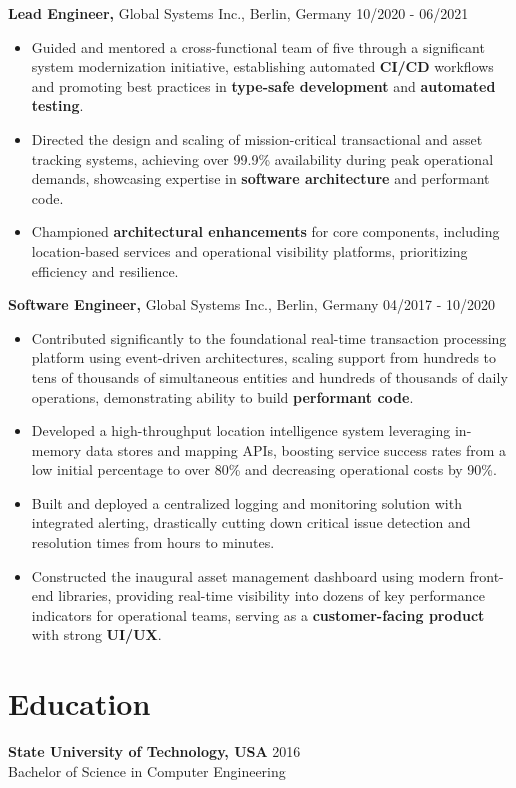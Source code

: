 \documentclass[10pt]{article}
\newcommand{\rightaligned}[1]{\hfill #1}
\begin{document}
\vspace{1mm}
\textbf{Lead Engineer,} Global Systems Inc., Berlin, Germany              \rightaligned{10/2020 - 06/2021}
\begin{itemize}
    \item Guided and mentored a cross-functional team of five through a significant system modernization
      initiative, establishing automated \textbf{CI/CD} workflows and promoting best practices in \textbf{type-safe
      development} and \textbf{automated testing}.
    \item Directed the design and scaling of mission-critical transactional and asset tracking systems,
      achieving over 99.9\% availability during peak operational demands, showcasing expertise in
      \textbf{software architecture} and performant code.
    \item Championed \textbf{architectural enhancements} for core components, including location-based services
      and operational visibility platforms, prioritizing efficiency and resilience.
\end{itemize}
\vspace{1mm}
\textbf{Software Engineer,} Global Systems Inc., Berlin, Germany           \rightaligned{04/2017 - 10/2020}
\begin{itemize}
    \item Contributed significantly to the foundational real-time transaction processing platform using
      event-driven architectures, scaling support from hundreds to tens of thousands of simultaneous
      entities and hundreds of thousands of daily operations, demonstrating ability to build
      \textbf{performant code}.
    \item Developed a high-throughput location intelligence system leveraging in-memory data stores and
      mapping APIs, boosting service success rates from a low initial percentage to over 80\% and
      decreasing operational costs by 90\%.
    \item Built and deployed a centralized logging and monitoring solution with integrated alerting,
      drastically cutting down critical issue detection and resolution times from hours to minutes.
    \item Constructed the inaugural asset management dashboard using modern front-end libraries, providing
      real-time visibility into dozens of key performance indicators for operational teams, serving as a
      \textbf{customer-facing product} with strong \textbf{UI/UX}.
\end{itemize}

\section*{Education}
\textbf{State University of Technology, USA}                                    \rightaligned{2016}\\
Bachelor of Science in Computer Engineering
\end{document}

